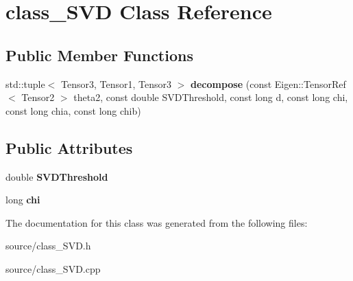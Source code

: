\hypertarget{classclass___s_v_d}{}\section{class\+\_\+\+S\+VD Class Reference}
\label{classclass___s_v_d}
\subsection*{Public Member Functions}
\begin{DoxyCompactItemize}
\item 
std\+::tuple$<$ Tensor3, Tensor1, Tensor3 $>$ {\bfseries decompose} (const Eigen\+::\+Tensor\+Ref$<$ Tensor2 $>$ theta2, const double S\+V\+D\+Threshold, const long d, const long chi, const long chia, const long chib)\hypertarget{classclass___s_v_d_a4e1ea6fd35dba11339dfff2a0fa6c315}{}\label{classclass___s_v_d_a4e1ea6fd35dba11339dfff2a0fa6c315}

\end{DoxyCompactItemize}
\subsection*{Public Attributes}
\begin{DoxyCompactItemize}
\item 
double {\bfseries S\+V\+D\+Threshold}\hypertarget{classclass___s_v_d_a53306a9b953e436bdb7b33200c32b048}{}\label{classclass___s_v_d_a53306a9b953e436bdb7b33200c32b048}

\item 
long {\bfseries chi}\hypertarget{classclass___s_v_d_a8693963779e738b98ff39ca699bb1633}{}\label{classclass___s_v_d_a8693963779e738b98ff39ca699bb1633}

\end{DoxyCompactItemize}


The documentation for this class was generated from the following files\+:\begin{DoxyCompactItemize}
\item 
source/class\+\_\+\+S\+V\+D.\+h\item 
source/class\+\_\+\+S\+V\+D.\+cpp\end{DoxyCompactItemize}
